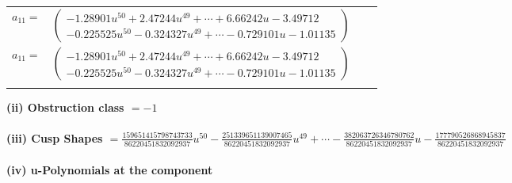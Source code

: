 \documentclass[1p]{elsarticle_modified}
\theoremstyle{definition}
\begin{document}
\begin{tabular}{m{7pt} m{180pt} m{7pt} m{180pt} }
\flushright $a_{11}=$&$\begin{pmatrix}-1.28901 u^{50}+2.47244 u^{49}+\cdots+6.66242 u-3.49712\\-0.225525 u^{50}-0.324327 u^{49}+\cdots-0.729101 u-1.01135\end{pmatrix}$\\ \flushright $a_{11}=$&$\begin{pmatrix}-1.28901 u^{50}+2.47244 u^{49}+\cdots+6.66242 u-3.49712\\-0.225525 u^{50}-0.324327 u^{49}+\cdots-0.729101 u-1.01135\end{pmatrix}$\\&\end{tabular}
\flushleft \textbf{(ii) Obstruction class $= -1$}\\~\\
\flushleft \textbf{(iii) Cusp Shapes $= \frac{159651415798743733}{86220451832092937} u^{50}-\frac{251339651139007465}{86220451832092937} u^{49}+\cdots-\frac{382063726346780762}{86220451832092937} u-\frac{177790526868945837}{86220451832092937}$}\\~\\
\newpage\renewcommand{\arraystretch}{1}
\flushleft \textbf{(iv) u-Polynomials at the component}\newline \\
\end{document}
